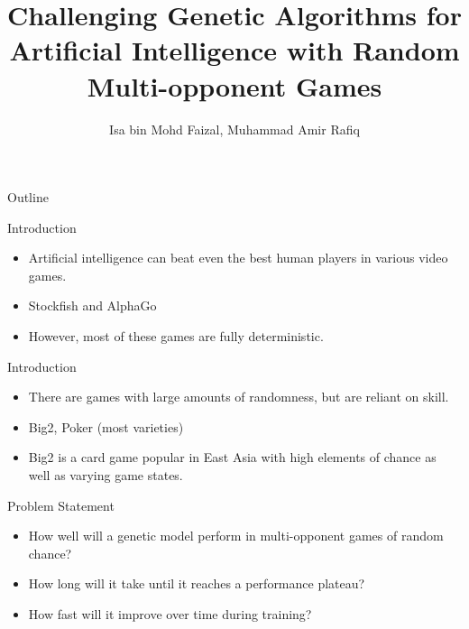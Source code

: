 \documentclass{beamer}
\title{Challenging Genetic Algorithms for Artificial Intelligence with Random Multi-opponent Games}
\author{Isa bin Mohd Faizal, Muhammad Amir Rafiq}
\institute{Universiti Kebangsaan Malaysia}
\begin{document}
	
	
\begin{frame}[plain]
    \maketitle
\end{frame}

\begin{frame}{Outline}

	\tableofcontents
	
\end{frame}

\begin{frame}{Introduction}
	
	\begin{itemize}
		\item  Artificial intelligence can beat even the best human players in various video games.
		\item Stockfish and AlphaGo \cite{chessai} \cite{goai}
		\item However, most of these games are fully deterministic.
		
	\end{itemize}
	
	
\end{frame}

\begin{frame}{Introduction}
	
	\begin{itemize}
		\item  There are games with large amounts of randomness, but are reliant on skill.
		\item Big2, Poker (most varieties)
		\item Big2 is a card game popular in East Asia with high elements of chance as well as varying game states. \cite{big2aitree}
		
	\end{itemize}
	
	
\end{frame}

\begin{frame}{Problem Statement}

	\begin{itemize}
		
		\item How well will a genetic model perform in multi-opponent games of random chance?
		\item How long will it take until it reaches a performance plateau?
		\item How fast will it improve over time during training?
		
		
	\end{itemize}

\end{frame}
\end{document}
